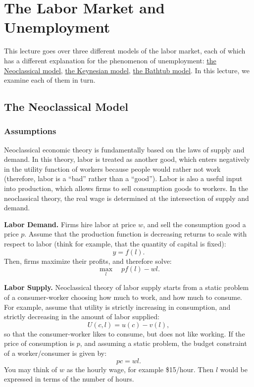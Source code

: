 \documentclass[]{book}
\theoremstyle{definition}
\theoremstyle{definition}
\theoremstyle{definition}
\theoremstyle{remark}
\begin{document}
\hypertarget{labor-market}{\chapter{The Labor Market and
Unemployment}\label{labor-market}}

This lecture goes over three different models of the labor market, each
of which has a different explanation for the phenomenon of unemployment:
\protect\hyperlink{neoclassical}{the Neoclassical model},
\protect\hyperlink{keynesian}{the Keynesian model},
\protect\hyperlink{bathtub}{the Bathtub model}. In this lecture, we
examine each of them in turn.

\hypertarget{neoclassical}{\section{The Neoclassical
Model}\label{neoclassical}}

\subsection{Assumptions}\label{assumptions-3}

Neoclassical economic theory is fundamentally based on the laws of
supply and demand. In this theory, labor is treated as another good,
which enters negatively in the utility function of workers because
people would rather not work (therefore, labor is a ``bad'' rather than
a ``good''). Labor is also a useful input into production, which allows
firms to sell consumption goods to workers. In the neoclassical theory,
the real wage is determined at the intersection of supply and demand.

\textbf{Labor Demand.} Firms hire labor at price \(w\), and sell the
consumption good a price \(p\). Assume that the production function is
decreasing returns to scale with respect to labor (think for example,
that the quantity of capital is fixed): \[y = f(l).\] Then, firms
maximize their profits, and therefore solve:
\[\max_l \quad pf(l) - wl.\]

\textbf{Labor Supply.} Neoclassical theory of labor supply starts from a
static problem of a consumer-worker choosing how much to work, and how
much to consume. For example, assume that utility is strictly increasing
in consumption, and strictly decreasing in the amount of labor supplied:
\[U(c, l)=u(c)-v(l),\] so that the consumer-worker likes to consume, but
does not like working. If the price of consumption is \(p\), and
assuming a static problem, the budget constraint of a worker/consumer is
given by: \[pc = wl.\] You may think of \(w\) as the hourly wage, for
example \$15/hour. Then \(l\) would be expressed in terms of the number
of hours.
\end{document}
